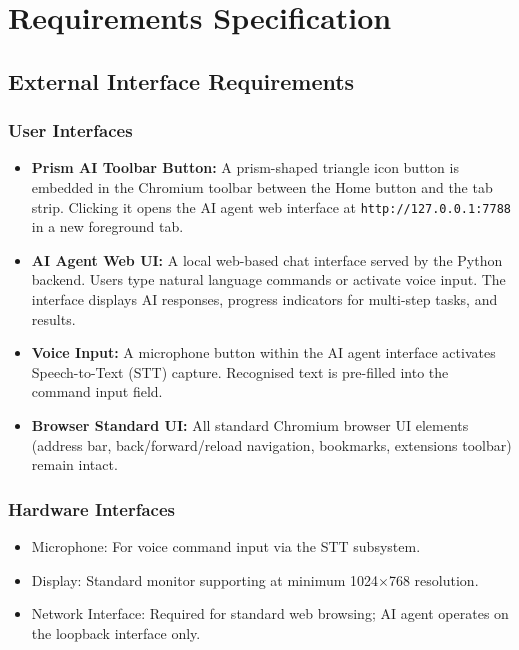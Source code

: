 \chapter{Requirements Specification}

\section{External Interface Requirements}

\subsection{User Interfaces}
\begin{itemize}[leftmargin=*]
    \item \textbf{Prism AI Toolbar Button:} A prism-shaped triangle icon button is embedded in the Chromium toolbar between the Home button and the tab strip. Clicking it opens the AI agent web interface at \texttt{http://127.0.0.1:7788} in a new foreground tab.
    \item \textbf{AI Agent Web UI:} A local web-based chat interface served by the Python backend. Users type natural language commands or activate voice input. The interface displays AI responses, progress indicators for multi-step tasks, and results.
    \item \textbf{Voice Input:} A microphone button within the AI agent interface activates Speech-to-Text (STT) capture. Recognised text is pre-filled into the command input field.
    \item \textbf{Browser Standard UI:} All standard Chromium browser UI elements (address bar, back/forward/reload navigation, bookmarks, extensions toolbar) remain intact.
\end{itemize}

\subsection{Hardware Interfaces}
\begin{itemize}[leftmargin=*]
    \item Microphone: For voice command input via the STT subsystem.
    \item Display: Standard monitor supporting at minimum 1024$\times$768 resolution.
    \item Network Interface: Required for standard web browsing; AI agent operates on the loopback interface only.
\end{itemize}

